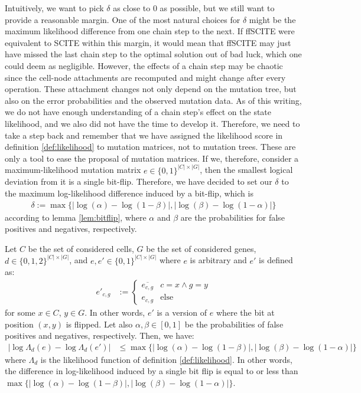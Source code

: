 Intuitively, we want to pick $\delta$ as close to 0 as possible, but we still want to provide a reasonable margin. One of the most natural choices for $\delta$ might be the maximum likelihood difference from one chain step to the next. If ffSCITE were equivalent to SCITE within this margin, it would mean that ffSCITE may just have missed the last chain step to the optimal solution out of bad luck, which one could deem as negligible. However, the effects of a chain step may be chaotic since the cell-node attachments are recomputed and might change after every operation. These attachment changes not only depend on the mutation tree, but also on the error probabilities and the observed mutation data. As of this writing, we do not have enough understanding of a chain step's effect on the state likelihood, and we also did not have the time to develop it. Therefore, we need to take a step back and remember that we have assigned the likelihood score in definition \ref{def:likelihood} to mutation matrices, not to mutation trees. These are only a tool to ease the proposal of mutation matrices. If we, therefore, consider a maximum-likelihood mutation matrix $e \in \{0,1\}^{|C| \times |G|}$, then the smallest logical deviation from it is a single bit-flip. Therefore, we have decided to set our $\delta$ to the maximum log-likelihood difference induced by a bit-flip, which is 
\begin{align*}
    \delta :=\max\{|\log(\alpha) - \log(1-\beta)|, |\log(\beta) - \log(1-\alpha)|\}
\end{align*}
according to lemma \ref{lem:bitflip}, where $\alpha$ and $\beta$ are the probabilities for false positives and negatives, respectively.

\begin{lemma}
    \label{lem:bitflip}
    Let $C$ be the set of considered cells, $G$ be the set of considered genes, $d \in \{0,1,2\}^{|C| \times |G|}$, and $e, e' \in \{0,1\}^{|C| \times |G|}$ where $e$ is arbitrary and $e'$ is defined as:
    \begin{align*}
        e'_{c,g} &:= \begin{cases}
            \overline{e_{c,g}} & c = x \wedge g = y \\
            e_{c,g} & \text{else}
        \end{cases}
    \end{align*}
    for some $x \in C$, $y \in G$. In other words, $e'$ is a version of $e$ where the bit at position $(x,y)$ is flipped. Let also $\alpha, \beta \in [0,1]$ be the probabilities of false positives and negatives, respectively. Then, we have:
    \begin{align*}
        |\log\Lambda_d(e) - \log\Lambda_d(e')| &\leq \max\{|\log(\alpha) - \log(1-\beta)|, |\log(\beta) - \log(1-\alpha)|\}
    \end{align*}
    where $\Lambda_d$ is the likelihood function of definition \ref{def:likelihood}. In other words, the difference in log-likelihood induced by a single bit flip is equal to or less than $\max\{|\log(\alpha) - \log(1-\beta)|, |\log(\beta) - \log(1-\alpha)|\}$.
\end{lemma}

